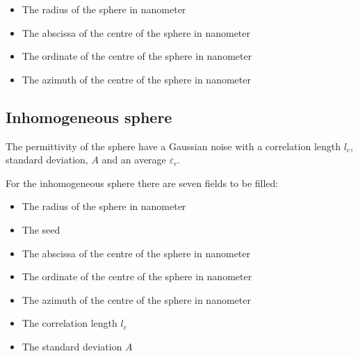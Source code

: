 \begin{itemize}
\item The radius of the sphere in nanometer
\item The abscissa of the centre of the sphere in nanometer
\item The ordinate of the centre of the sphere in nanometer
\item The azimuth of the centre of the sphere in nanometer
\end{itemize}

\subsection{Inhomogeneous sphere }


The permittivity of the sphere have a Gaussian noise with a
correlation length $l_c$, standard deviation, $A$ and an average
$\varepsilon_r$.

For the inhomogeneous sphere there are seven fields to be filled:

\begin{itemize}
\item The radius of the sphere in nanometer
\item The seed
\item The abscissa of the centre of the sphere in nanometer
\item The ordinate of the centre of the sphere in nanometer
\item The azimuth of the centre of the sphere in nanometer
\item The correlation length $l_c$
\item The standard deviation $A$
\end{itemize}




